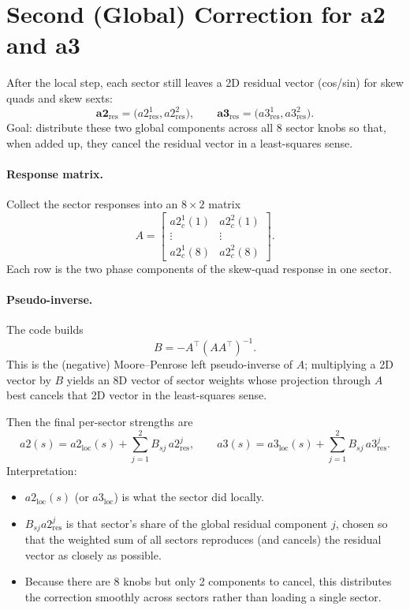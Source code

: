 \documentclass[11pt]{article}
\begin{document}
\section{Second (Global) Correction for a2 and a3}
After the local step, each sector still leaves a 2D residual vector (cos/sin) for skew quads and skew sexts:
\[
\mathbf{a2}_{\mathrm{res}}=\bigl(a2_{\mathrm{res}}^1, a2_{\mathrm{res}}^2\bigr),\qquad
\mathbf{a3}_{\mathrm{res}}=\bigl(a3_{\mathrm{res}}^1, a3_{\mathrm{res}}^2\bigr).
\]
Goal: distribute these two global components across all 8 sector knobs so that, when added up, they cancel the residual vector in a least-squares sense.

\paragraph{Response matrix.} Collect the sector responses into an $8\times 2$ matrix
\[
A = \begin{bmatrix}
a2_c^1(1) & a2_c^2(1)\\
\vdots & \vdots\\
a2_c^1(8) & a2_c^2(8)
\end{bmatrix}.
\]
Each row is the two phase components of the skew-quad response in one sector.

\paragraph{Pseudo-inverse.} The code builds
\[
B = -A^\top (A A^\top)^{-1}.
\]
This is the (negative) Moore–Penrose left pseudo-inverse of $A$; multiplying a 2D vector by $B$ yields an 8D vector of sector weights whose projection through $A$ best cancels that 2D vector in the least-squares sense.

Then the final per-sector strengths are
\[
a2(s) = a2_{\mathrm{loc}}(s) + \sum_{j=1}^2 B_{s j}\, a2_{\mathrm{res}}^j,\qquad
a3(s) = a3_{\mathrm{loc}}(s) + \sum_{j=1}^2 B_{s j}\, a3_{\mathrm{res}}^j.
\]
Interpretation:
\begin{itemize}
  \item $a2_{\mathrm{loc}}(s)$ (or $a3_{\mathrm{loc}}$) is what the sector did locally.
  \item $B_{sj} a2_{\mathrm{res}}^j$ is that sector's share of the global residual component $j$, chosen so that the weighted sum of all sectors reproduces (and cancels) the residual vector as closely as possible.
  \item Because there are 8 knobs but only 2 components to cancel, this distributes the correction smoothly across sectors rather than loading a single sector.
\end{itemize}
\end{document}
